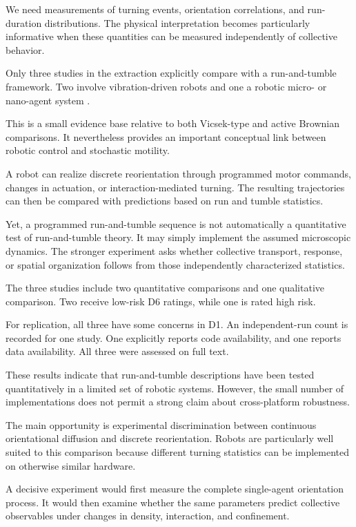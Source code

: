 We need measurements of turning
events, orientation correlations,
and run-duration distributions.
The physical interpretation
becomes particularly informative
when these quantities can be
measured independently of
collective behavior.

Only three studies in the extraction
explicitly compare with a
run-and-tumble framework.
Two involve vibration-driven
robots and one a robotic
micro- or nano-agent system
\cite{Noirhomme2024brainbotsassmarta,Raghavendra2026programmablepersist,Balda2024playingwithactive}.

This is a small evidence base
relative to both Vicsek-type
and active Brownian comparisons.
It nevertheless provides
an important conceptual link
between robotic control
and stochastic motility.

A robot can realize
discrete reorientation
through programmed
motor commands,
changes in actuation,
or interaction-mediated
turning. The resulting
trajectories can then
be compared with
predictions based
on run and tumble
statistics.

Yet, a programmed
run-and-tumble sequence
is not automatically
a quantitative test
of run-and-tumble
theory. It may simply
implement the assumed
microscopic dynamics.
The stronger experiment
asks whether collective
transport, response,
or spatial organization
follows from those
independently characterized
statistics.

The three studies include
two quantitative comparisons
and one qualitative comparison.
Two receive low-risk
D6 ratings, while one
is rated high risk.

For replication,
all three have
some concerns in D1.
An independent-run
count is recorded
for one study.
One explicitly reports
code availability,
and one reports
data availability.
All three were
assessed on full text.

These results indicate
that run-and-tumble
descriptions have
been tested quantitatively
in a limited set
of robotic systems.
However, the small
number of implementations
does not permit a
strong claim about
cross-platform robustness.

The main opportunity
is experimental
discrimination between
continuous orientational
diffusion and discrete
reorientation.
Robots are particularly
well suited to this
comparison because
different turning
statistics can be
implemented on
otherwise similar
hardware.

A decisive experiment
would first measure
the complete single-agent
orientation process.
It would then examine
whether the same
parameters predict
collective observables
under changes in
density, interaction,
and confinement.


